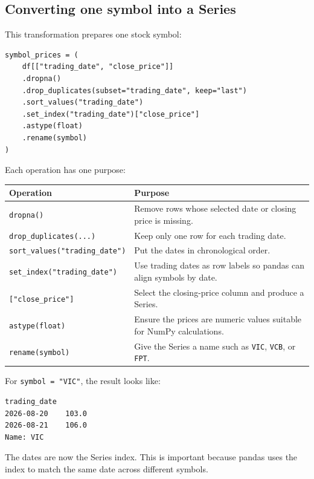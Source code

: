 \documentclass[11pt,a4paper]{article}
\begin{document}
\subsection{Converting one symbol into a Series}

This transformation prepares one stock symbol:

\begin{lstlisting}[style=python]
symbol_prices = (
    df[["trading_date", "close_price"]]
    .dropna()
    .drop_duplicates(subset="trading_date", keep="last")
    .sort_values("trading_date")
    .set_index("trading_date")["close_price"]
    .astype(float)
    .rename(symbol)
)
\end{lstlisting}

Each operation has one purpose:

\begin{center}
\begin{tabular}{p{5.8cm} p{7.3cm}}
\toprule
\textbf{Operation} & \textbf{Purpose} \\
\midrule
\texttt{dropna()}
    & Remove rows whose selected date or closing price is missing. \\[1mm]
\texttt{drop\_duplicates(...)}
    & Keep only one row for each trading date. \\[1mm]
\texttt{sort\_values("trading\_date")}
    & Put the dates in chronological order. \\[1mm]
\texttt{set\_index("trading\_date")}
    & Use trading dates as row labels so pandas can align symbols by date. \\[1mm]
\texttt{["close\_price"]}
    & Select the closing-price column and produce a Series. \\[1mm]
\texttt{astype(float)}
    & Ensure the prices are numeric values suitable for NumPy calculations. \\[1mm]
\texttt{rename(symbol)}
    & Give the Series a name such as \texttt{VIC}, \texttt{VCB}, or
      \texttt{FPT}. \\
\bottomrule
\end{tabular}
\end{center}

For \texttt{symbol = "VIC"}, the result looks like:

\begin{lstlisting}[style=terminal]
trading_date
2026-08-20    103.0
2026-08-21    106.0
Name: VIC
\end{lstlisting}

The dates are now the Series index. This is important because pandas uses the
index to match the same date across different symbols.
\end{document}
